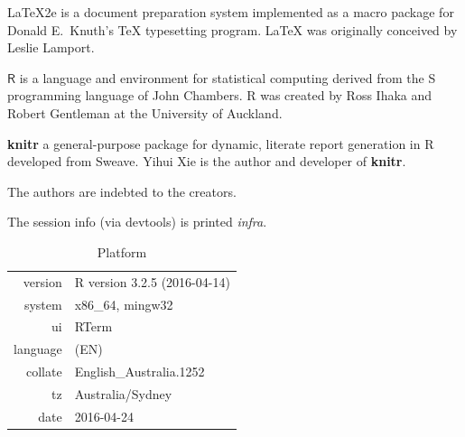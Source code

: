 \begin{subappendices}
\begin{multicols*}{2}
\LaTeX2e{} is a document preparation system implemented as a macro package for Donald E.\ Knuth's \TeX{} typesetting program. \LaTeX{} was originally conceived by Leslie Lamport. 

$\mathsf{R}$ is a language and environment for statistical computing derived from the S programming language of John Chambers. R was created by Ross Ihaka and Robert Gentleman at the University of Auckland. 

\textbf{knitr} a general-purpose package for dynamic, literate report generation in R developed from Sweave. Yihui Xie is the author and developer of \textbf{knitr}. 

The authors are indebted to the creators.

The session info (via devtools) is printed \emph{infra}.
\end{multicols*}


\begin{table}[!htb]
\centering
\caption{Platform}
\begin{tabular}{rl}
  \toprule
 version & R version 3.2.5 (2016-04-14) \\ 
  system & x86\_64, mingw32 \\ 
  ui & RTerm \\ 
  language & (EN) \\ 
  collate & English\_Australia.1252 \\ 
  tz & Australia/Sydney \\ 
  date & 2016-04-24 \\ 
   \bottomrule
\end{tabular}

\end{table}

\onecolumn



\end{subappendices}
